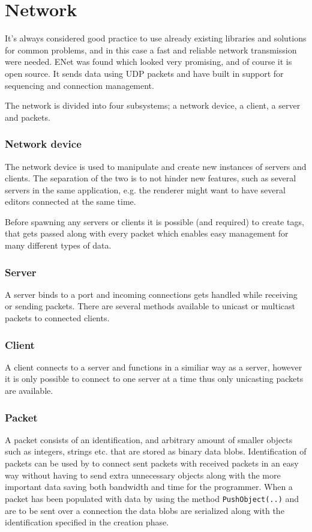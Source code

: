 \chapter{Network}
It's always considered good practice to use already existing libraries and solutions for common problems, and in this case a fast and reliable network transmission were needed.
ENet was found which looked very promising, and of course it is open source. It sends data using UDP packets and have built in support for sequencing and connection management. 

The network is divided into four subsystems; a network device, a client, a server and packets.


\subsection{Network device}
The network device is used to manipulate and create new instances of servers and clients. The separation of the two is to not hinder new features, such as several servers in the same application, e.g. the renderer might want to have several editors connected at the same time.

Before spawning any servers or clients it is possible (and required) to create tags, that gets passed along with every packet which enables easy management for many different types of data.


\subsection{Server}
A server binds to a port and incoming connections gets handled while receiving or sending packets. There are several methods available to unicast or multicast packets to connected clients.

\subsection{Client}
A client connects to a server and functions in a similiar way as a server, however it is only possible to connect to one server at a time thus only unicasting packets are available.

\subsection{Packet}
A packet consists of an identification, and arbitrary amount of smaller objects such as integers, strings etc. that are stored as binary data blobs.
Identification of packets can be used by to connect sent packets with received packets in an easy way without having to send extra unnecessary objects along with the more important data saving both bandwidth and time for the programmer.
When a packet has been populated with data by using the method \texttt{PushObject(..)} and are to be sent over a connection the data blobs are serialized along with the identification specified in the creation phase.


